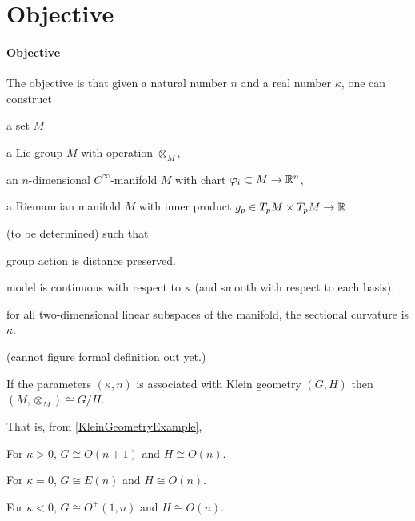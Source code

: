 \documentclass[../main.tex]{subfiles}
\begin{document}
\section{Objective}
\paragraph{Objective}\label{Objective}
The objective is that
given a natural number $n$ and a real number $\kappa$,
one can construct
\begin{APAenumerate}
    \item a set $M$
    \item a Lie group $M$ with operation $\otimes_M$,
    \item an $n$-dimensional $C^\infty$-manifold $M$ with chart $\varphi_i \subset M\to\mathbb{R}^n$,
    \item a Riemannian manifold $M$ with inner product $g_p\in T_pM\times T_pM\to\mathbb{R}$
\end{APAenumerate}
(to be determined)
such that
\begin{APAitemize}
    \item group action is distance preserved.
    \item model is continuous with respect to $\kappa$ (and smooth with respect to each basis).
    \item for all two-dimensional linear subspaces of the manifold, the sectional curvature is $\kappa$.
\end{APAitemize}
(cannot figure formal definition out yet.)

\begin{conjecture}\label{GeometricGroupStructure}
    If the parameters $\left(\kappa,n\right)$ is associated with Klein geometry $\left(G,H\right)$
    then $\left(M,\otimes_M\right)\cong G/H$.

    That is, from \cref{KleinGeometryExample},
    \begin{APAitemize}
        \item For $\kappa>0$, $G\cong O\left(n+1\right)$ and $H\cong O\left(n\right)$.
        \item For $\kappa=0$, $G\cong E\left(n\right)$ and $H\cong O\left(n\right)$.
        \item For $\kappa<0$, $G\cong O^{+}\left(1,n\right)$ and $H\cong O\left(n\right)$.
    \end{APAitemize}
\end{conjecture}
\end{document}
